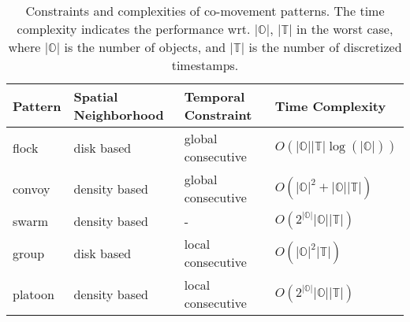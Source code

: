 
\begin{table}[h]
\centering
\caption{Constraints and complexities of co-movement patterns. The time complexity indicates the performance wrt.
$|\mathbb{O}|$, $|\mathbb{T}|$ in the worst case, where $|\mathbb{O}|$ is the number of objects, and $|\mathbb{T}|$ is the number of discretized timestamps.}\label{tbl:existing_co_patterns}
\begin{tabular}{|l|l|l|l|}
\hline 
\textbf{Pattern} & {\textbf{Spatial Neighborhood}} & { \textbf{Temporal Constraint}} & { \textbf{Time Complexity}}\\ 
\hline 
flock~\cite{gudmundsson2006computing} & disk based &  global consecutive & {$O(|\mathbb{O}||\mathbb{T}|\log(|\mathbb{O}|))$} \\ 
\hline 
convoy~\cite{jeung2008discovery} & density  based&   global consecutive & {$O(|\mathbb{O}|^2+|\mathbb{O}||\mathbb{T}|)$}\\ 
\hline 
swarm~\cite{li2010swarm} & density based & - & {$O(2^{|\mathbb{O}|}|\mathbb{O}||\mathbb{T}|)$}  \\ 
\hline 
group~\cite{wang2006grouppattern} & disk based &  local consecutive & {$O(|\mathbb{O}|^2|\mathbb{T}|)$}\\ 
\hline 
platoon~\cite{li2015platoon} & density based &  local consecutive & {$O(2^{|\mathbb{O}|}|\mathbb{O}||\mathbb{T}|)$}\\ 
\hline 
\end{tabular} 
\end{table}

